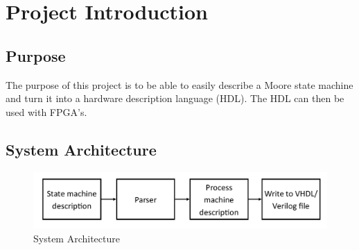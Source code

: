 \section{Project Introduction}
\subsection{Purpose}
The purpose of this project is to be able to easily describe a Moore state
machine and turn it into a hardware description language (HDL). The HDL can
then be used with FPGA's.

\subsection{System Architecture}
\begin{figure}[h]
   \centering
   \includegraphics[scale=0.6]{SystemArchitecture}
   \caption{System Architecture}
   \label{fig:SysArchitecture}
\end{figure}

